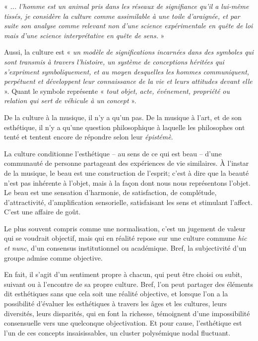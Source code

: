  « \textit{... l’homme est un animal pris dans les réseaux de signifiance qu’il a lui-même tissés, je considère la culture comme assimilable à une toile d’araignée, et par suite son analyse comme relevant non d’une science expérimentale en quête de loi mais d’une science interprétative en quête de sens.} »

Aussi, la culture est « \textit{un modèle de significations incarnées dans des symboles qui sont transmis à travers l'histoire, un système de conceptions héritées qui s'expriment symboliquement, et au moyen desquelles les hommes communiquent, perpétuent et développent leur connaissance de la vie et leurs attitudes devant elle} ». Quant le symbole représente « \textit{tout objet, acte, événement, propriété ou relation qui sert de véhicule à un concept} ».

\bigskip

De la culture à la musique, il n'y a qu'un pas. De la musique à l'art, et de son esthétique, il n'y a qu'une question philosophique à laquelle les philosophes  ont tenté et tentent encore de répondre selon leur \textit{épistémè}.

La culture conditionne l'esthétique -- au sens de ce qui est beau -- d'une communauté de personne partageant des expériences de vie similaires. 
À l'instar de la musique, le beau est une construction de l'esprit; c'est à dire que la beauté n'est pas inhérente à l'objet, mais à la façon dont nous nous représentons l'objet. Le beau est une sensation d'harmonie, de satisfaction, de complétude, d'attractivité, d'amplification sensorielle, satisfaisant les sens et stimulant l'affect. C'est une affaire de goût.

Le plus souvent compris comme une normalisation, c'est un jugement de valeur qui se voudrait objectif, mais qui en réalité repose sur une culture commune \textit{hic et nunc}, d'un consensus institutionnel ou académique. Bref, la subjectivité d'un groupe admise comme objective.

 En fait, il s'agit d'un sentiment propre à chacun, qui peut être choisi ou subit, suivant ou à l'encontre de sa propre culture. Bref, l'on peut partager des éléments dit esthétiques sans que cela soit une réalité objective, et lorsque l'on a la possibilité d'évaluer les esthétiques à travers les âges et les cultures, leurs diversités, leurs disparités,  qui en font la richesse, témoignent d'une impossibilité consensuelle vers une quelconque objectivation. Et pour cause, l'esthétique est l'un de ces concepts insaisissables, un cluster polysémique nodal fluctuant.

